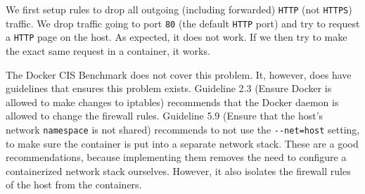 We first setup rules to drop all outgoing (including forwarded) \lstinline{HTTP} (not \lstinline{HTTPS}) traffic. We drop traffic going to port \lstinline{80} (the default \lstinline{HTTP} port) and try to request a \lstinline{HTTP} page on the host. As expected, it does not work. If we then try to make the exact same request in a container, it works.

\hfill

The Docker CIS Benchmark does not cover this problem. It, however, does have guidelines that ensures this problem exists. Guideline 2.3 (Ensure Docker is allowed to make changes to iptables) recommends that the Docker daemon is allowed to change the firewall rules. Guideline 5.9 (Ensure that the host's network \lstinline{namespace} is not shared) recommends to not use the \lstinline{--net=host} setting, to make sure the container is put into a separate network stack. These are a good recommendations, because implementing them removes the need to configure a containerized network stack ourselves. However, it also isolates the firewall rules of the host from the containers.
